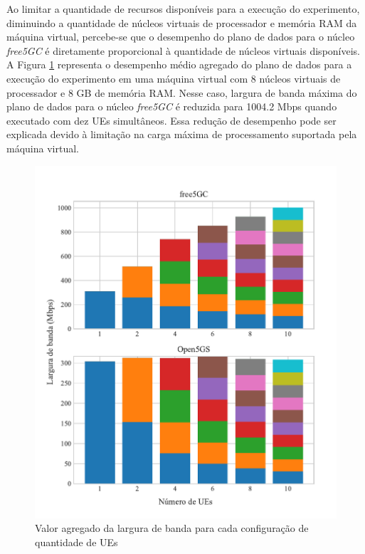 Ao limitar a quantidade de recursos disponíveis para a execução do experimento, diminuindo a quantidade de núcleos virtuais de processador e memória RAM da máquina virtual, percebe-se que o desempenho do plano de dados para o núcleo \textit{free5GC} é diretamente proporcional à quantidade de núcleos virtuais disponíveis.
A Figura \ref{fig:exp2_all_8-8} representa o desempenho médio agregado do plano de dados para a execução do experimento em uma máquina virtual com 8 núcleos virtuais de processador e 8 GB de memória RAM.
Nesse caso, largura de banda máxima do plano de dados para o núcleo \textit{free5GC} é reduzida para 1004.2 Mbps quando executado com dez UEs simultâneos.
Essa redução de desempenho pode ser explicada devido à limitação na carga máxima de processamento suportada pela máquina virtual.

\begin{figure}[H]
    \centering
    \includegraphics[width=1\textwidth]{TG2/Chapters/DataAnalysis/Figures/EXP2-ALL-8C-8GB.pdf}
    \caption{Valor agregado da largura de banda para cada configuração de quantidade de UEs}
    \label{fig:exp2_all_8-8}
\end{figure}

